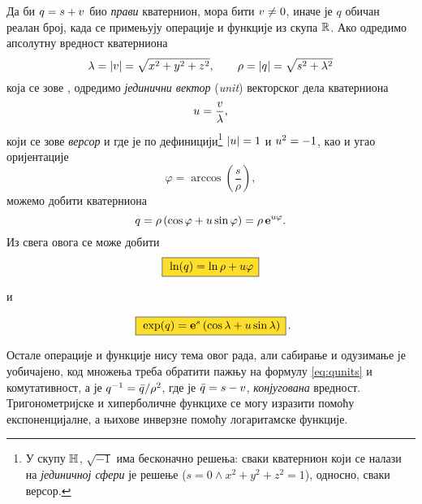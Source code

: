 Да би $q=s+{v}$ био {\sl прави\/} кватернион, мора бити ${v}\ne0$, иначе је $q$ обичан реалан број,
када се примењују операције и функције из скупа ${\mathbb R}$.
Ако одредимо апсолутну вредност кватерниона
$$
\lambda = {\vert{v}\vert} = \sqrt{\mathstrut x^2+y^2+z^2},\qquad
\rho = {\vert q\vert} = \sqrt{\mathstrut s^2+\lambda^2}
$$
која се зове {\sl {}\/}, одредимо
{\sl јединични вектор\/} ({\sl unit\/}) векторског дела кватерниона
$$
{u} = \frac {{v}}\lambda, 
$$
који се зове {\sl версор\/}
и где је по дефиницији\footnote{У 
скупу ${\mathbb H}$, $\sqrt{-1}$ има бесконачно решења:
сваки кватернион који се налази на {\sl јединичној сфери\/} је решење
($s=0\land x^2+y^2+z^2=1$), односно, сваки версор.} 
${\vert{u}\vert}=1$ и  ${u}^2=-1$,
као и угао оријентације
$$
\varphi = \arccos\left( \frac s\rho \right),
$$
можемо добити  кватерниона
\begin{equation}
q
=\rho\,(\cos\varphi + {u}\sin\varphi)
=\rho\,{\bf e}^{{u}\varphi}.
\end{equation}
Из свега овога се може добити
\begin{equation}\index{ln@$\ln$}
    \okvir{\ln(q)  = \ln\rho + \uv\varphi}
\end{equation}
\centerline{и}
\begin{equation}\index{exp@$\exp$}
    \okvir{\exp(q) = \e^s \left( \cos\lambda + \uv\sin\lambda \right)}\rlap{.}
\end{equation}

\medskip

\danger
Остале операције и функције нису тема овог рада, али сабирање и одузимање
је уобичајено, код множења треба обратити пажњу на формулу \eqref{eq:qunits} и
комутативност, а  је
$q^{-1}={\bar q}/\rho^2$, где је ${\bar q}=s-{v}$, {\sl конјугована\/} вредност. 
Тригонометријске и хиперболичне функцихе се могу изразити помоћу експоненцијалне,
а њихове инверзне помоћу логаритамске функције.

